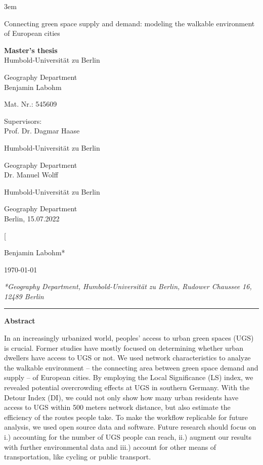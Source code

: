 \documentclass[10pt]{article}
\begin{document}
\emergencystretch 3em
\onecolumn

{\center
\vspace*{5cm}
{\Huge Connecting green space supply and demand: modeling the walkable environment of European cities}
\par\bigskip
\Large{
\textbf{Master's thesis}\\
Humbold-Universit\"at zu Berlin

Geography Department
\\
Benjamin Labohm

Mat. Nr.: 
545609
\vfill
}
}
\large{


Supervisors: \\
Prof. Dr. Dagmar Haase

Humbold-Universit\"at zu Berlin

Geography Department\\


Dr. Manuel Wolff

Humbold-Universit\"at zu Berlin

Geography Department \\

Berlin, 15.07.2022
}

\newpage
\normalsize
\tableofcontents
\newpage
\listoffigures
\newpage

\twocolumn[{\vspace{3ex}
	{\large Benjamin Labohm*\par}\vspace{2ex}
	\today\par\vspace{4ex}}
\textit{\small{*Geography Department, Humbold-Universit\"at zu Berlin, Rudower Chaussee 16, 12489 Berlin}} \\
\smallbreak
\hrule 

\vspace*{.5cm}

\textbf{Abstract}

In an increasingly urbanized world, peoples’ access to urban green spaces (UGS) is crucial. 
Former studies have mostly focused on determining whether urban dwellers have access to UGS or not.
We used network characteristics to analyze the walkable environment – the connecting area between green space demand and supply – of European cities. 
By employing the Local Significance (LS) index, we revealed potential overcrowding effects at UGS in southern Germany.
With the Detour Index (DI), we could not only show how many urban residents have access to UGS within 500 meters network distance, but also estimate the efficiency of the routes people take. 
To make the workflow replicable for future analysis, we used open source data and software.
Future research should focus on i.) accounting for the number of UGS people can reach, ii.) augment our results with further environmental data and iii.) account for other means of transportation, like cycling or public transport.
\end{document}
